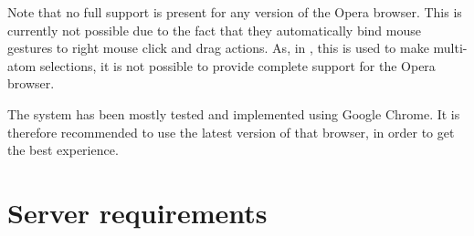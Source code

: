 Note that no full support is present for any version of the Opera browser. This is currently not possible due to the fact that they automatically bind mouse gestures to right mouse click and drag actions. As, in \oframp, this is used to make multi-atom selections, it is not possible to provide complete support for the Opera browser.

The system has been mostly tested and implemented using Google Chrome. It is therefore recommended to use the latest version of that browser, in order to get the best experience.


\section{Server requirements}
\nlipsum
